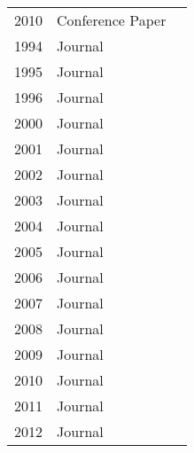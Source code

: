 \begin{table}[]
\begin{tabular}{lll}
2010          & Conference Paper & \cite{Yu2010a}                                                                      \\
1994          & Journal          & \cite{Avritzer1994}                                                                 \\
1995          & Journal          & \cite{Avritzer1995}\cite{Trent1995}                                                 \\
1996          & Journal          & \cite{Yang1996}                                                                     \\
2000          & Journal          & \cite{Weyuker2000}                                                                  \\
2001          & Journal          & \cite{El-far2001}                                                                   \\
2002          & Journal          & \cite{Menasce2002a}                                                                 \\
2003          & Journal          & \cite{Brown2003}                                                                    \\
2004          & Journal          & \cite{Dumitrescu2004}\cite{Sandler2004}                                             \\
2005          & Journal          & \cite{Briand2005}                                                                   \\
2006          & Journal          & \cite{Garousi2006}                                                                  \\
2007          & Journal          & \cite{Cai2007}\cite{Nevedrov2007}\cite{Bertolino2008}                               \\
2008          & Journal          & \cite{Bayan2008}                                                                    \\
2009          & Journal          & \cite{Acharya2009}                                                                  \\
2010          & Journal          & \cite{Wang2010}\cite{Malik2010b}                                                    \\
2011          & Journal          & \cite{Babbar2011}\cite{Barna2011}\cite{Nguyen2011}\cite{Shoaib2011}\cite{Zhang2011} \\
2012          & Journal          & \cite{Yan2012}\cite{Grechanik2012}\cite{Vasar2012}                                  \\

\end{tabular}
\end{table}
